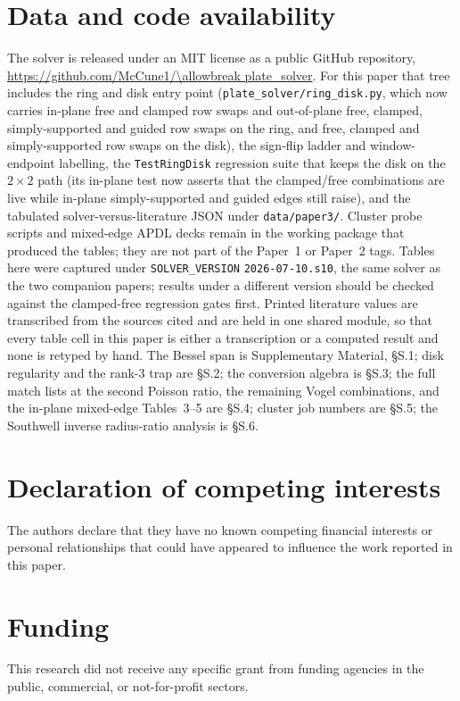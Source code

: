 \documentclass[11pt]{article}
\begin{document}
\section*{Data and code availability}
\begin{sloppypar}
The solver is released under an MIT license as a public GitHub repository,
\url{https://github.com/McCune1/\allowbreak plate_solver}.
For this paper that tree includes the ring and disk entry point
(\texttt{plate\_solver/ring\_disk.py}, which now carries in-plane free and
clamped row swaps and out-of-plane free, clamped, simply-supported and
guided row swaps on the ring, and free, clamped and simply-supported row
swaps on the disk), the sign-flip ladder and window-endpoint labelling, the
\texttt{TestRingDisk} regression suite that keeps the disk on the
$2\times2$ path (its in-plane test now asserts that the clamped/free
combinations are live while in-plane simply-supported and guided edges
still raise), and the tabulated
solver-versus-literature JSON under \texttt{data/paper3/}. Cluster probe
scripts and mixed-edge APDL decks remain in the working package that
produced the tables; they are not part of the Paper~1 or Paper~2 tags.
Tables here were captured under
\texttt{SOLVER\_VERSION} \texttt{2026-07-10.s10}, the same solver as the two
companion papers; results under a different version should be checked against
the clamped-free regression gates first. Printed literature values are
transcribed from the sources cited and are held in one shared module, so that
every table cell in this paper is either a transcription or a computed result
and none is retyped by hand. The Bessel span is Supplementary Material,
\S{}S.1; disk regularity and the rank-3 trap are \S{}S.2; the conversion
algebra is \S{}S.3; the full match lists at the second Poisson ratio, the
remaining Vogel combinations, and the in-plane mixed-edge Tables~3--5 are
\S{}S.4; cluster job numbers are \S{}S.5; the Southwell inverse
radius-ratio analysis is \S{}S.6.
\end{sloppypar}

\section*{Declaration of competing interests}
The authors declare that they have no known competing financial interests or
personal relationships that could have appeared to influence the work reported
in this paper.

\section*{Funding}
This research did not receive any specific grant from funding agencies in the
public, commercial, or not-for-profit sectors.
\end{document}
